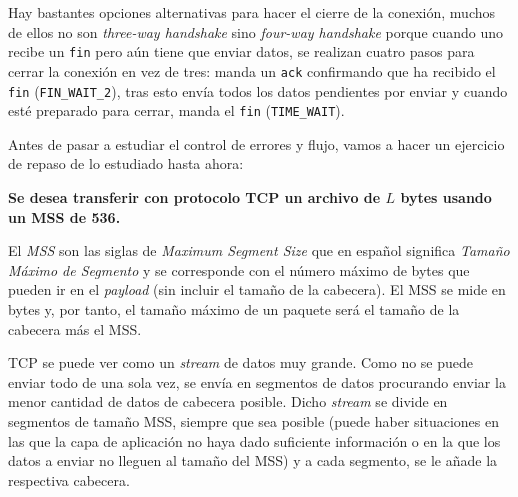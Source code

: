 \documentclass[10pt,a4paper,spanish]{report}
\begin{document}
Hay bastantes opciones alternativas para hacer el cierre de la conexión, muchos de ellos no son \textit{\textcolor{tema3}{three-way handshake}} sino \textit{\textcolor{tema3}{four-way handshake}} porque cuando uno recibe un \texttt{fin} pero aún tiene que enviar datos, se realizan cuatro pasos para cerrar la conexión en vez de tres: manda un \texttt{ack} confirmando que ha recibido el \texttt{fin} (\texttt{FIN\_WAIT\_2}), tras esto envía todos los datos pendientes por enviar y cuando esté preparado para cerrar, manda el \texttt{fin} (\texttt{TIME\_WAIT}).

Antes de pasar a estudiar el control de errores y flujo, vamos a hacer un ejercicio de repaso de lo estudiado hasta ahora:

\textbf{Se desea transferir con protocolo TCP un archivo de $L$ bytes usando un MSS de 536.}

El \textit{\textcolor{tema3}{MSS}} son las siglas de \textit{\textcolor{tema3}{Maximum Segment Size}}  que en español significa \textit{\textcolor{tema3}{Tamaño Máximo de Segmento}} y se corresponde con el número máximo de bytes que pueden ir en el \textcolor{tema3}{\textit{payload}} (sin incluir el tamaño de la cabecera). El MSS se mide en bytes y, por tanto, el tamaño máximo de un paquete será el tamaño de la cabecera más el MSS. 

TCP se puede ver como un \textit{\textcolor{tema3}{stream}} de datos muy grande. Como no se puede enviar todo de una sola vez, se envía en segmentos de datos procurando enviar la menor cantidad de datos de cabecera posible. Dicho \textit{\textcolor{tema3}{stream}} se divide en segmentos de tamaño MSS, siempre que sea posible (puede haber situaciones en las que la capa de aplicación no haya dado suficiente información o en la que los datos a enviar no lleguen al tamaño del MSS) y a cada segmento, se le añade la respectiva cabecera.
\end{document}

